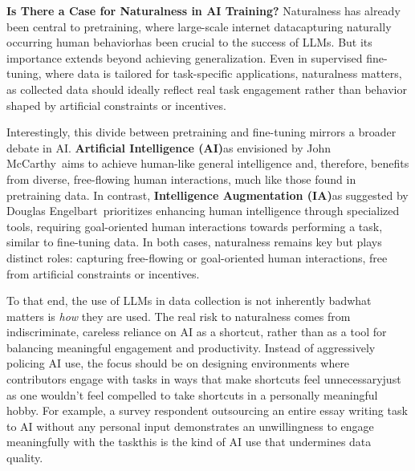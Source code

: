 \textbf{Is There a Case for Naturalness in AI Training?}
Naturalness has already been central to pretraining, where large-scale internet data\textemdash{}capturing naturally occurring human behavior\textemdash{}has been crucial to the success of LLMs. But its importance extends beyond achieving generalization. Even in supervised fine-tuning, where data is tailored for task-specific applications, naturalness matters, as collected data should ideally reflect real task engagement rather than behavior shaped by artificial constraints or incentives.

Interestingly, this divide between pretraining and fine-tuning mirrors a broader debate in AI. \textbf{Artificial Intelligence (AI)}\textemdash{}as envisioned by John McCarthy~\cite{mccarthy1987generality}\textemdash{}aims to achieve human-like general intelligence and, therefore, benefits from diverse, free-flowing human interactions, much like those found in pretraining data. In contrast, \textbf{Intelligence Augmentation (IA)}\textemdash{}as suggested by Douglas Engelbart~\cite{engelbart1962augmenting}\textemdash{}prioritizes enhancing human intelligence through specialized tools, requiring goal-oriented human interactions towards performing a task, similar to fine-tuning data. In both cases, naturalness remains key but plays distinct roles: capturing free-flowing or goal-oriented human interactions, free from artificial constraints or incentives.

To that end, the use of LLMs in data collection is not inherently bad\textemdash{}what matters is \textit{how} they are used. The real risk to naturalness comes from indiscriminate, careless reliance on AI as a shortcut, rather than as a tool for balancing meaningful engagement and productivity. Instead of aggressively policing AI use, the focus should be on designing environments where contributors engage with tasks in ways that make shortcuts feel unnecessary\textemdash{}just as one wouldn't feel compelled to take shortcuts in a personally meaningful hobby. For example, a survey respondent outsourcing an entire essay writing task to AI without any personal input demonstrates an unwillingness to engage meaningfully with the task\textemdash{}this is the kind of AI use that undermines data quality.
